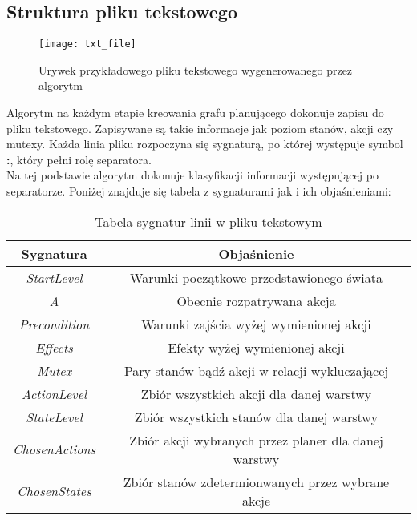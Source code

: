     \subsection{Struktura pliku tekstowego}
    \begin{figure}
        \texttt{[image: txt\_file]}
        \centering
        \caption{Urywek przykładowego pliku tekstowego wygenerowanego przez algorytm}
    \end{figure}
    Algorytm na każdym etapie kreowania grafu planującego dokonuje zapisu do pliku tekstowego. Zapisywane są takie informacje jak poziom stanów, 
    akcji czy mutexy. Każda linia pliku rozpoczyna się sygnaturą, po której występuje symbol \textbf{:}, który pełni rolę separatora. \\
    Na tej podstawie algorytm dokonuje klasyfikacji informacji występującej po separatorze. 
    Poniżej znajduje się tabela z sygnaturami jak i ich objaśnieniami:
    \begin{table}[H]
        \centering
         \begin{tabular}{||c | c||} 
         \hline
         Sygnatura & Objaśnienie \\ [0.5ex] 
         \hline\hline
         \textit{StartLevel} & Warunki początkowe przedstawionego świata \\ 
         \hline
         \textit{A} &  Obecnie rozpatrywana akcja \\
         \hline
         \textit{Precondition} & Warunki zajścia wyżej wymienionej akcji \\
         \hline
         \textit{Effects} & Efekty wyżej wymienionej akcji \\
         \hline
         \textit{Mutex} & Pary stanów bądź akcji w relacji wykluczającej \\ 
         \hline
         \textit{ActionLevel} & Zbiór wszystkich akcji dla danej warstwy \\ 
         \hline
         \textit{StateLevel} & Zbiór wszystkich stanów dla danej warstwy\\ 
         \hline
         \textit{ChosenActions} & Zbiór akcji wybranych przez planer dla danej warstwy\\ 
         \hline
         \textit{ChosenStates} & Zbiór stanów zdetermionwanych przez wybrane akcje\\ 
         \hline
         \end{tabular}
         \caption{Tabela sygnatur linii w pliku tekstowym}
    \end{table}

